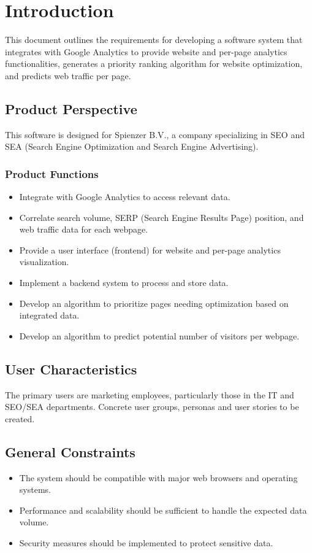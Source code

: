 \documentclass[12pt]{article}
\begin{document}
\section{Introduction}
\setcounter{page}{1}
This document outlines the requirements for developing a software system that integrates with Google Analytics to provide website and per-page analytics functionalities, generates a priority ranking algorithm for website optimization, and predicts web traffic per page.

\subsection{Product Perspective}
This software is designed for Spienzer B.V., a company specializing in SEO and SEA (Search Engine Optimization and Search Engine Advertising).

\subsubsection{Product Functions}
\begin{itemize}
    \item Integrate with Google Analytics to access relevant data.
    \item Correlate search volume, SERP (Search Engine Results Page) position, and web traffic data for each webpage.
    \item Provide a user interface (frontend) for website and per-page analytics visualization.
    \item Implement a backend system to process and store data.
    \item Develop an algorithm to prioritize pages needing optimization based on integrated data.
    \item Develop an algorithm to predict potential number of visitors per webpage.
\end{itemize}

\subsection{User Characteristics}
The primary users are marketing employees, particularly those in the IT and SEO/SEA departments.
Concrete user groups, personas and user stories to be created.

\subsection{General Constraints}
\begin{itemize}
    \item The system should be compatible with major web browsers and operating systems.
    \item Performance and scalability should be sufficient to handle the expected data volume.
    \item Security measures should be implemented to protect sensitive data.
\end{itemize}
\end{document}
